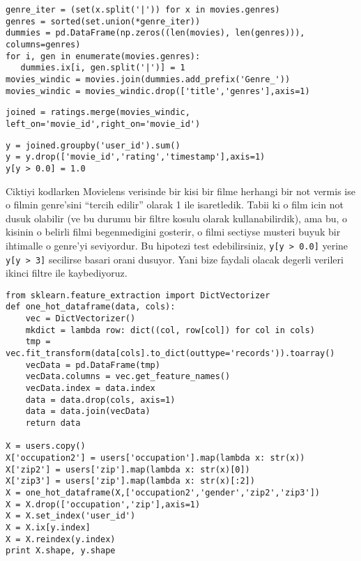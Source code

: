 \documentclass[12pt,fleqn]{article}\usepackage{../common}
\begin{document}
\begin{verbatim}
genre_iter = (set(x.split('|')) for x in movies.genres)
genres = sorted(set.union(*genre_iter))
dummies = pd.DataFrame(np.zeros((len(movies), len(genres))), columns=genres)
for i, gen in enumerate(movies.genres):
   dummies.ix[i, gen.split('|')] = 1
movies_windic = movies.join(dummies.add_prefix('Genre_'))
movies_windic = movies_windic.drop(['title','genres'],axis=1)
\end{verbatim}

\begin{verbatim}
joined = ratings.merge(movies_windic, left_on='movie_id',right_on='movie_id')
\end{verbatim}

\begin{verbatim}
y = joined.groupby('user_id').sum()
y = y.drop(['movie_id','rating','timestamp'],axis=1)
y[y > 0.0] = 1.0
\end{verbatim}

Ciktiyi kodlarken Movielens verisinde bir kisi bir filme herhangi bir not
vermis ise o filmin genre'sini ``tercih edilir'' olarak 1 ile
isaretledik. Tabii ki o film icin not dusuk olabilir (ve bu durumu bir
filtre kosulu olarak kullanabilirdik), ama bu, o kisinin o belirli filmi
begenmedigini gosterir, o filmi sectiyse musteri buyuk bir ihtimalle o
genre'yi seviyordur. Bu hipotezi test edebilirsiniz, \verb!y[y > 0.0]!
yerine \verb!y[y > 3]!  secilirse basari orani dusuyor. Yani bize faydali
olacak degerli verileri ikinci filtre ile kaybediyoruz.

\begin{verbatim}
from sklearn.feature_extraction import DictVectorizer
def one_hot_dataframe(data, cols):
    vec = DictVectorizer()
    mkdict = lambda row: dict((col, row[col]) for col in cols)
    tmp = vec.fit_transform(data[cols].to_dict(outtype='records')).toarray()
    vecData = pd.DataFrame(tmp)
    vecData.columns = vec.get_feature_names()
    vecData.index = data.index
    data = data.drop(cols, axis=1)
    data = data.join(vecData)
    return data

X = users.copy()
X['occupation2'] = users['occupation'].map(lambda x: str(x))
X['zip2'] = users['zip'].map(lambda x: str(x)[0])
X['zip3'] = users['zip'].map(lambda x: str(x)[:2])
X = one_hot_dataframe(X,['occupation2','gender','zip2','zip3'])
X = X.drop(['occupation','zip'],axis=1)
X = X.set_index('user_id')
X = X.ix[y.index]
X = X.reindex(y.index)
print X.shape, y.shape
\end{verbatim}
\end{document}
